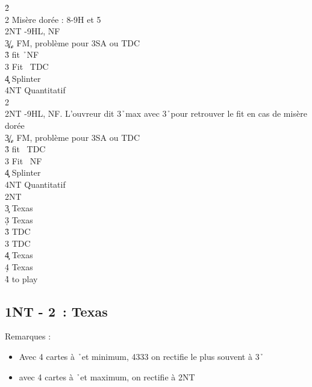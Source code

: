 \documentclass[a4paper]{article}
\begin{document}
\begin{bidtable}
2\h\+\\
2\s \> Misère dorée : 8-9H et 5\s \\
2NT -9HL, NF\\
3\c\d {}\c /\d , FM, problème pour 3SA ou TDC\\
3\h \> fit \h\ NF\\
3\s \> Fit \s\ TDC\\
4\c\d \> Splinter\\
4NT \> Quantitatif\-\\
2\s\+\\
2NT -9HL, NF. L'ouvreur dit 3\h\ max avec 3\h\ pour retrouver le fit en cas de misère dorée\\
3\c\d {}\c /\d , FM, problème pour 3SA ou TDC\\
3\h \> fit \s\ TDC\\
3\s \> Fit \s\ NF\\
4\c\d \> Splinter\\
4NT \> Quantitatif\-\\
2NT\+\\
3\c \> Texas \h \\
3\d \> Texas \s \\
3\h \> TDC\\
3\s \> TDC\\
4\c \> Texas \h \\
4\d \> Texas \s \\
4\h\s \> to play\-
\end{bidtable}

\subsection{1NT - 2\pdfd\ : Texas \pdfh}

Remarques :

\begin{itemize}
\item Avec 4 cartes à \h\ et minimum, 4333 on rectifie le plus souvent à 3\h\ 

\item avec 4 cartes à \h\ et maximum, on rectifie à 2NT

\end{itemize}
\end{document}
